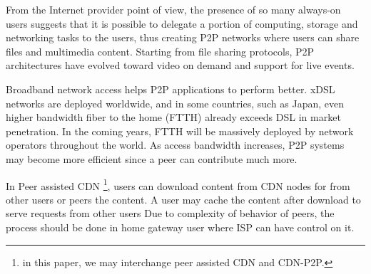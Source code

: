 \documentclass[conference]{IEEEtran}
\begin{document}
From the Internet provider point of view, the presence of so many always-on users suggests that it is possible to delegate a portion of computing, storage and networking tasks to the users, thus creating P2P networks where users can share files and multimedia content.
Starting from file sharing protocols, P2P architectures have evolved toward video on demand and support for live events.

Broadband network access helps P2P applications to perform better.
xDSL networks are deployed worldwide, and in some countries, such as Japan, even higher bandwidth fiber to the home (FTTH) already exceeds DSL in market penetration.  In the coming years, FTTH will be massively deployed by network operators throughout the world.  
As access bandwidth increases, P2P systems may become more efficient since a peer can contribute much more.

In Peer assisted CDN \footnote{in this paper, we may interchange peer assisted CDN and CDN-P2P.}, users can download content from CDN nodes for from other users or peers the content.
A user may cache the content after download to serve requests from other users
Due to complexity of behavior of peers, the process should be done in home gateway user where ISP can have control on it. 
\end{document}
